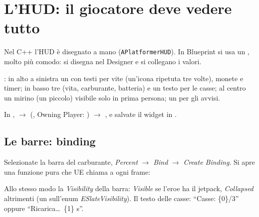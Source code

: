 \section{L'HUD: il giocatore deve vedere tutto}

Nel C++ l'HUD è disegnato a mano (\texttt{APlatformerHUD}). In Blueprint si usa un , molto più comodo: si disegna nel Designer e si collegano i valori.

\begin{ricetta}
  \item {}: in alto a sinistra un  con testi per vite (un'icona ripetuta tre volte), monete e timer; in basso tre  (vita, carburante, batteria) e un testo per le casse; al centro un mirino (un  piccolo) visibile solo in prima persona; un   per gli avvisi.
  \item In ,  $\rightarrow$  (, Owning Player: ) $\rightarrow$ , e salvate il widget in .
\end{ricetta}

\subsection{Le barre: binding}

Selezionate la barra del carburante, \emph{Percent} $\rightarrow$ \emph{Bind} $\rightarrow$ \emph{Create Binding}. Si apre una funzione pura che UE chiama a ogni frame:

\begin{bpgraph}
\end{bpgraph}

Allo stesso modo la \emph{Visibility} della barra: \emph{Visible} se l'eroe ha il jetpack, \emph{Collapsed} altrimenti (un  sull'enum \emph{ESlateVisibility}). Il testo delle casse:  ``Casse: \{0\}/3'' oppure ``Ricarica\dots\ \{1\} s''.

